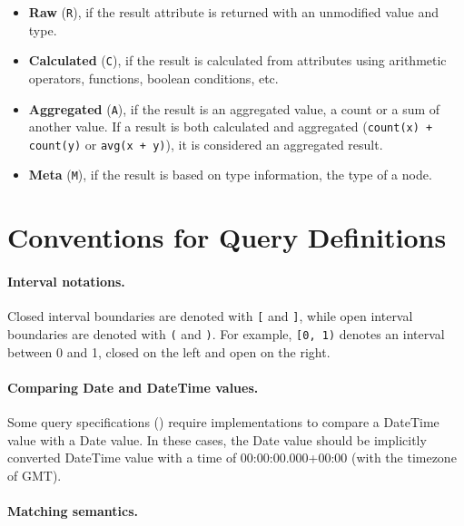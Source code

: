 \begin{itemize}
	\item \textbf{Raw} (\texttt{R}), if the result attribute is returned with an unmodified value and type.
	\item \textbf{Calculated} (\texttt{C}), if the result is calculated from attributes using arithmetic operators, functions, boolean conditions, etc.
	\item \textbf{Aggregated} (\texttt{A}), if the result is an aggregated value, \eg a count or a sum of another value. If a result is both calculated and aggregated (\eg \lstinline{count(x) + count(y)} or \lstinline{avg(x + y)}), it is considered an aggregated result.
	\item \textbf{Meta} (\texttt{M}), if the result is based on type information, \eg the type of a node.
\end{itemize}



\section{Conventions for Query Definitions}

\paragraph{Interval notations.} Closed interval boundaries are denoted with 
\texttt{[} 
and \texttt{]}, while open interval boundaries are denoted with \texttt{(} and 
\texttt{)}. For example, \texttt{[0, 1)} denotes an interval between 0 and 1, 
closed on the left and open on the right.

\paragraph{Comparing Date and DateTime values.}

Some query specifications (\eg {}) require implementations to compare a
\textsf{DateTime} value with a \textsf{Date} value. In these cases, the 
\textsf{Date} value should be implicitly converted \textsf{DateTime} value 
with a time of 00:00:00.000+00:00 (\ie with the timezone of GMT).

\paragraph{Matching semantics.}

